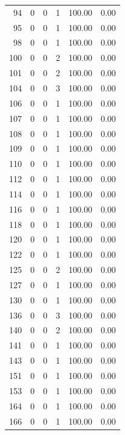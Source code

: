 \documentclass[11pt]{article}
\begin{document}
\begin{longtable}{r|r|r|r|r|r}
    94    & 0     & 0     & 1     & 100.00 & 0.00 \\
    95    & 0     & 0     & 1     & 100.00 & 0.00 \\
    98    & 0     & 0     & 1     & 100.00 & 0.00 \\
    100   & 0     & 0     & 2     & 100.00 & 0.00 \\
    101   & 0     & 0     & 2     & 100.00 & 0.00 \\
    104   & 0     & 0     & 3     & 100.00 & 0.00 \\
    106   & 0     & 0     & 1     & 100.00 & 0.00 \\
    107   & 0     & 0     & 1     & 100.00 & 0.00 \\
    108   & 0     & 0     & 1     & 100.00 & 0.00 \\
    109   & 0     & 0     & 1     & 100.00 & 0.00 \\
    110   & 0     & 0     & 1     & 100.00 & 0.00 \\
    112   & 0     & 0     & 1     & 100.00 & 0.00 \\
    114   & 0     & 0     & 1     & 100.00 & 0.00 \\
    116   & 0     & 0     & 1     & 100.00 & 0.00 \\
    118   & 0     & 0     & 1     & 100.00 & 0.00 \\
    120   & 0     & 0     & 1     & 100.00 & 0.00 \\
    122   & 0     & 0     & 1     & 100.00 & 0.00 \\
    125   & 0     & 0     & 2     & 100.00 & 0.00 \\
    127   & 0     & 0     & 1     & 100.00 & 0.00 \\
    130   & 0     & 0     & 1     & 100.00 & 0.00 \\
    136   & 0     & 0     & 3     & 100.00 & 0.00 \\
    140   & 0     & 0     & 2     & 100.00 & 0.00 \\
    141   & 0     & 0     & 1     & 100.00 & 0.00 \\
    143   & 0     & 0     & 1     & 100.00 & 0.00 \\
    151   & 0     & 0     & 1     & 100.00 & 0.00 \\
    153   & 0     & 0     & 1     & 100.00 & 0.00 \\
    164   & 0     & 0     & 1     & 100.00 & 0.00 \\
    166   & 0     & 0     & 1     & 100.00 & 0.00 \\
    \bottomrule
\end{longtable}
\end{document}
